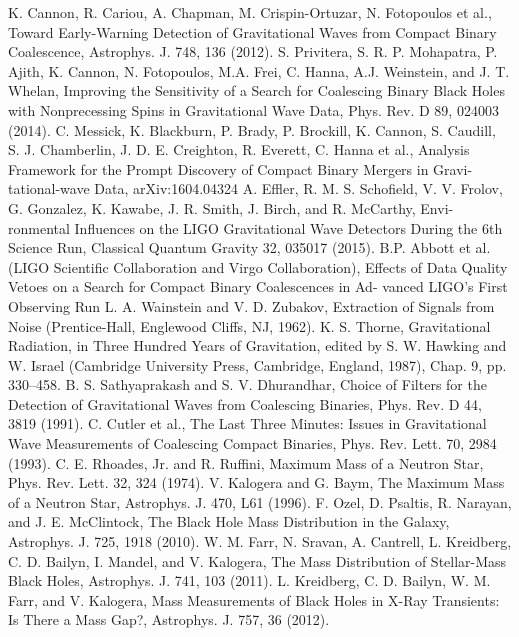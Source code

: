 \documentclass[binding=0.6cm, LaM]{sapthesis}
\begin{document}
\begin{thebibliography}{500}
         K. Cannon, R. Cariou, A. Chapman, M. Crispin-Ortuzar, N. Fotopoulos et al., Toward Early-Warning Detection of Gravitational Waves from Compact Binary Coalescence, Astrophys. J. 748, 136 (2012).
 	 S. Privitera, S. R. P. Mohapatra, P. Ajith, K. Cannon, N. Fotopoulos, M.A. Frei, C. Hanna, A.J. Weinstein, and J. T. Whelan, Improving the Sensitivity of a Search for Coalescing Binary Black Holes with Nonprecessing Spins in Gravitational Wave Data, Phys. Rev. D 89, 024003 (2014).
          C. Messick, K. Blackburn, P. Brady, P. Brockill, K. Cannon, S. Caudill, S. J. Chamberlin, J. D. E. Creighton, R. Everett, C. Hanna et al., Analysis Framework for the Prompt Discovery of Compact Binary Mergers in Gravi- tational-wave Data, arXiv:1604.04324
          A. Effler, R. M. S. Schofield, V. V. Frolov, G. Gonzalez, K. Kawabe, J. R. Smith, J. Birch, and R. McCarthy, Envi- ronmental Influences on the LIGO Gravitational Wave Detectors During the 6th Science Run, Classical Quantum Gravity 32, 035017 (2015). 
         B.P. Abbott et al. (LIGO Scientific Collaboration and Virgo Collaboration), Effects of Data Quality Vetoes on a Search for Compact Binary Coalescences in Ad- vanced LIGO’s First Observing Run 
         L. A. Wainstein and V. D. Zubakov, Extraction of Signals from Noise (Prentice-Hall, Englewood Cliffs, NJ, 1962). 
          K. S. Thorne, Gravitational Radiation, in Three Hundred Years of Gravitation, edited by S. W. Hawking and W. Israel (Cambridge University Press, Cambridge, England, 1987), Chap. 9, pp. 330–458. 
         B. S. Sathyaprakash and S. V. Dhurandhar, Choice of Filters for the Detection of Gravitational Waves from Coalescing Binaries, Phys. Rev. D 44, 3819 (1991). 
 	 C. Cutler et al., The Last Three Minutes: Issues in Gravitational Wave Measurements of Coalescing Compact Binaries, Phys. Rev. Lett. 70, 2984 (1993).
 	 C. E. Rhoades, Jr. and R. Ruffini, Maximum Mass of a Neutron Star, Phys. Rev. Lett. 32, 324 (1974). 
	 V. Kalogera and G. Baym, The Maximum Mass of a Neutron Star, Astrophys. J. 470, L61 (1996). 
	 F. Ozel, D. Psaltis, R. Narayan, and J. E. McClintock, The Black Hole Mass Distribution in the Galaxy, Astrophys. J. 725, 1918 (2010). 
	 W. M. Farr, N. Sravan, A. Cantrell, L. Kreidberg, C. D. Bailyn, I. Mandel, and V. Kalogera, The Mass Distribution of Stellar-Mass Black Holes, Astrophys. J. 741, 103 (2011). 
	 L. Kreidberg, C. D. Bailyn, W. M. Farr, and V. Kalogera, Mass Measurements of Black Holes in X-Ray Transients: Is There a Mass Gap?, Astrophys. J. 757, 36 (2012). 

\end{thebibliography}
\end{document}
